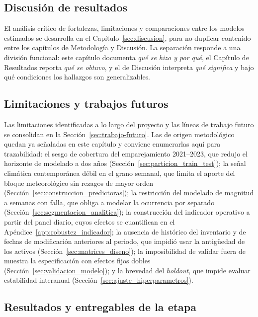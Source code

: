 \subsection{Discusión de resultados}
\label{sec:discusion_resultados_etapa6}
El análisis crítico de fortalezas, limitaciones y comparaciones entre los modelos estimados se desarrolla en el Capítulo~\ref{sec:discusion}, para no duplicar contenido entre los capítulos de Metodología y Discusión. La separación responde a una división funcional: este capítulo documenta \textit{qué se hizo y por qué}, el Capítulo de Resultados reporta \textit{qué se obtuvo}, y el de Discusión interpreta \textit{qué significa} y bajo qué condiciones los hallazgos son generalizables.

\subsection{Limitaciones y trabajos futuros}
\label{sec:limitaciones_etapa6}
Las limitaciones identificadas a lo largo del proyecto y las líneas de trabajo futuro se consolidan en la Sección~\ref{sec:trabajo-futuro}. Las de origen metodológico quedan ya señaladas en este capítulo y conviene enumerarlas aquí para trazabilidad: el sesgo de cobertura del emparejamiento 2021--2023, que redujo el horizonte de modelado a dos años (Sección~\ref{sec:particion_train_test}); la señal climática contemporánea débil en el grano semanal, que limita el aporte del bloque meteorológico sin rezagos de mayor orden (Sección~\ref{sec:construccion_predictoras}); la restricción del modelado de magnitud a semanas con falla, que obliga a modelar la ocurrencia por separado (Sección~\ref{sec:segmentacion_analitica}); la construcción del indicador operativo a partir del panel diario, cuyos efectos se cuantifican en el Apéndice~\ref{app:robustez_indicador}; la ausencia de histórico del inventario y de fechas de modificación anteriores al periodo, que impidió usar la antigüedad de los activos (Sección~\ref{sec:matrices_diseno}); la imposibilidad de validar fuera de muestra la especificación con efectos fijos dobles (Sección~\ref{sec:validacion_modelo}); y la brevedad del \emph{holdout}, que impide evaluar estabilidad interanual (Sección~\ref{sec:ajuste_hiperparametros}).

\subsection{Resultados y entregables de la etapa}
\label{sec:resultados_etapa6_met}


